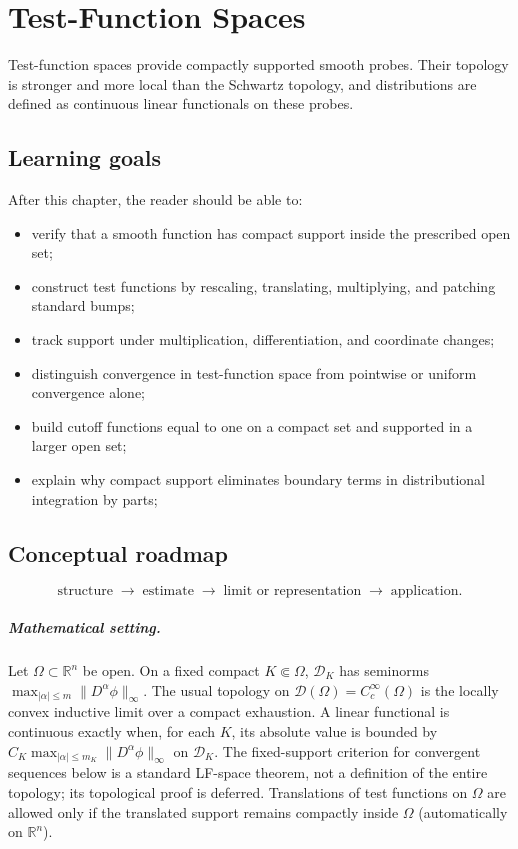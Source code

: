 \chapter{Test-Function Spaces}
\label{ch:iii15}

Test-function spaces provide compactly supported smooth probes. Their topology is stronger and more local than the Schwartz topology, and distributions are defined as continuous linear functionals on these probes.

\section*{Learning goals}
After this chapter, the reader should be able to:
\begin{itemize}
\item verify that a smooth function has compact support inside the prescribed open set;
\item construct test functions by rescaling, translating, multiplying, and patching standard bumps;
\item track support under multiplication, differentiation, and coordinate changes;
\item distinguish convergence in test-function space from pointwise or uniform convergence alone;
\item build cutoff functions equal to one on a compact set and supported in a larger open set;
\item explain why compact support eliminates boundary terms in distributional integration by parts;
\end{itemize}
\section*{Conceptual roadmap}
\[
\boxed{\text{structure}\;\longrightarrow\;\text{estimate}\;\longrightarrow\;\text{limit or representation}\;\longrightarrow\;\text{application}.}
\]

\paragraph{Mathematical setting.}
Let $\Omega\subset\mathbb R^n$ be open. On a fixed compact $K\Subset\Omega$, $\mathcal D_K$ has seminorms $\max_{|\alpha|\le m}\|D^\alpha\phi\|_\infty$. The usual topology on $\mathcal D(\Omega)=C_c^\infty(\Omega)$ is the locally convex inductive limit over a compact exhaustion. A linear functional is continuous exactly when, for each $K$, its absolute value is bounded by $C_K\max_{|\alpha|\le m_K}\|D^\alpha\phi\|_\infty$ on $\mathcal D_K$. The fixed-support criterion for convergent sequences below is a standard LF-space theorem, not a definition of the entire topology; its topological proof is deferred. Translations of test functions on $\Omega$ are allowed only if the translated support remains compactly inside $\Omega$ (automatically on $\mathbb R^n$).

